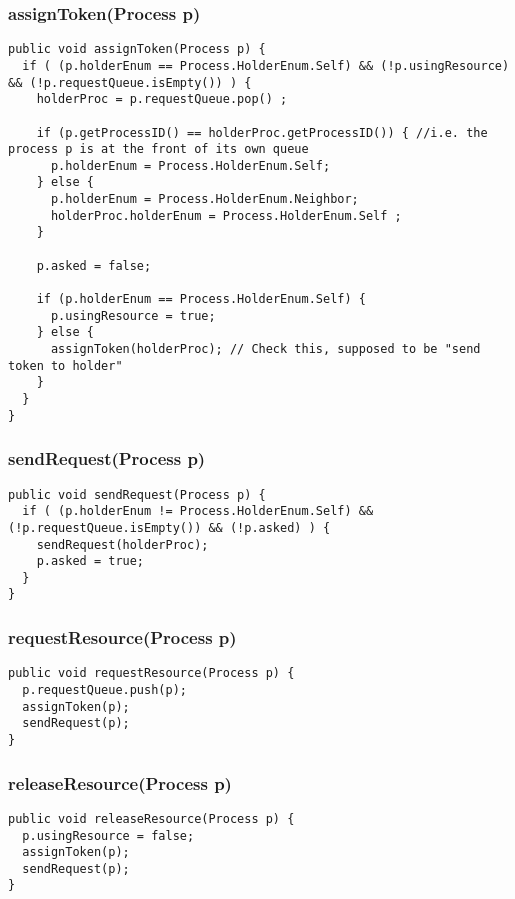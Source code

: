 \documentclass{article}
\begin{document}
		\subsubsection{assignToken(Process p)}
		\begin{lstlisting}
public void assignToken(Process p) {
  if ( (p.holderEnum == Process.HolderEnum.Self) && (!p.usingResource) && (!p.requestQueue.isEmpty()) ) {
    holderProc = p.requestQueue.pop() ;

    if (p.getProcessID() == holderProc.getProcessID()) { //i.e. the process p is at the front of its own queue
      p.holderEnum = Process.HolderEnum.Self;
    } else {
      p.holderEnum = Process.HolderEnum.Neighbor;
      holderProc.holderEnum = Process.HolderEnum.Self ;
    }
	
    p.asked = false;
	
    if (p.holderEnum == Process.HolderEnum.Self) {
      p.usingResource = true;
    } else {
      assignToken(holderProc); // Check this, supposed to be "send token to holder"
    }
  }
}
		\end{lstlisting}
		
		\subsubsection{sendRequest(Process p)}
		\begin{lstlisting}
public void sendRequest(Process p) {
  if ( (p.holderEnum != Process.HolderEnum.Self) && (!p.requestQueue.isEmpty()) && (!p.asked) ) {
    sendRequest(holderProc);
    p.asked = true;
  }
}
		\end{lstlisting}
		\subsubsection{requestResource(Process p)}
		\begin{lstlisting}
public void requestResource(Process p) {
  p.requestQueue.push(p);
  assignToken(p);
  sendRequest(p);
}
		\end{lstlisting}
		
		\subsubsection{releaseResource(Process p)}
		\begin{lstlisting}
public void releaseResource(Process p) {
  p.usingResource = false;
  assignToken(p);
  sendRequest(p);
}
		\end{lstlisting}
		
\end{document}
